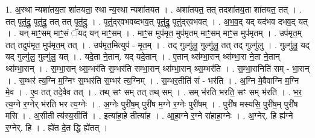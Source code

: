 \documentclass[17pt]{extarticle}
\begin{document}
1. अ॒स्था न्यशा॑तय॒ता शा॑तयता॒ स्था न्य॒स्था न्यशा॑तयत । . अशा॑तयत॒ तत् तदशा॑तय॒ता शा॑तयत॒ तत् । . तत् पूतु॑द्रु॒ पूतु॑द्रु॒ तत् तत् पूतु॑द्रु । . पूतु॑द्‍र्वभवब्दभव॒त् पूतु॑द्रु॒ पूतु॑द्‍र्वभवत् । . अ॒भ॒व॒द् यद् यद॑भव दभव॒द् यत् । . यन् माꣳ॒॒सम् माꣳ॒॒सं ॅयद् यन् माꣳ॒॒सम् । . माꣳ॒॒स मुप॑मृत॒ मुप॑मृतम् माꣳ॒॒सम् माꣳ॒॒स मुप॑मृतम् । . उप॑मृत॒म् तत् तदुप॑मृत॒ मुप॑मृत॒म् तत् । . उप॑मृत॒मित्युप॑ - मृ॒त॒म् । . तद् गुल्गु॑लु॒ गुल्गु॑लु॒ तत् तद् गुल्गु॑लु । . गुल्गु॑लु॒ यद् यद् गुल्गु॑लु॒ गुल्गु॑लु॒ यत् । . यदे॒ता ने॒तान्. यद् यदे॒तान् । . ए॒तान् थ्स॑म्भा॒रान् थ्स॑म्भा॒रा ने॒ता ने॒तान् थ्स॑म्भा॒रान् । . स॒म्भा॒रान् थ्स॒म्भर॑ति स॒म्भर॑ति सम्भा॒रान् थ्स॑म्भा॒रान् थ्स॒म्भर॑ति । . स॒म्भा॒रानिति॑ सम् - भा॒रान् । . स॒म्भर॑ त्य॒ग्नि म॒ग्निꣳ स॒म्भर॑ति स॒म्भर॑ त्य॒ग्निम् । . स॒म्भर॒तीति॑ सं - भर॑ति । . अ॒ग्नि मे॒वैवाग्नि म॒ग्नि मे॒व । . ए॒व तत् तदे॒वैव तत् । . तथ् सꣳ सम् तत् तथ् सम् । . सम् भ॑रति भरति॒ सꣳ सम् भ॑रति । . भ॒र॒ त्य॒ग्ने र॒ग्नेर् भ॑रति भर त्य॒ग्नेः । . अ॒ग्नेः पुरी॑ष॒म् पुरी॑ष म॒ग्ने र॒ग्नेः पुरी॑षम् । . पुरी॑ष मस्यसि॒ पुरी॑ष॒म् पुरी॑ष मसि । . अ॒सीती त्य॑स्य॒सीति॑ । . इत्या॑हा॒हे तीत्या॑ह । . आ॒हा॒ग्ने र॒ग्ने रा॑हाहा॒ग्नेः । . अ॒ग्नेर्. हि ह्य॑ग्ने र॒ग्नेर्. हि । . ह्ये॑त दे॒त द्धि ह्ये॑तत् । \newline
\end{document}
